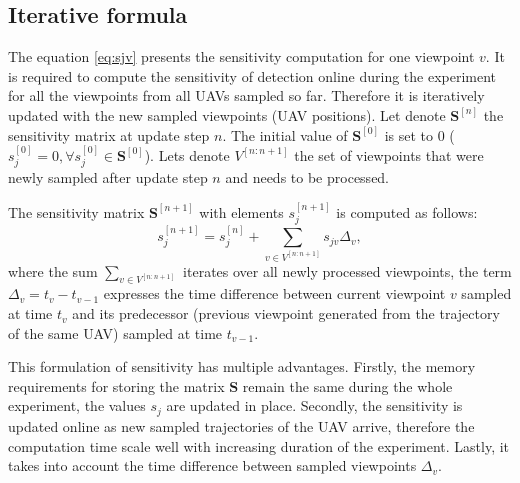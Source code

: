 \subsection{Iterative formula}
The equation \ref{eq:sjv} presents the sensitivity computation for one viewpoint $v$. 
It is required to compute the sensitivity of detection online during the experiment for all the viewpoints from all \ac{UAV}s sampled so far. 
Therefore it is iteratively updated with the new sampled viewpoints (\ac{UAV} positions).
Let denote $\mathbf{S}^{[n]}$ the sensitivity matrix at update step $n$.
The initial value of $\mathbf{S}^{[0]}$ is set to $0$ ($s_{j}^{[0]} = 0 ,\forall s_{j}^{[0]} \in \mathbf{S}^{[0]}$).
Lets denote $V^{[n:n+1]}$ the set of viewpoints that were newly sampled after update step $n$ and needs to be processed. 

The sensitivity matrix $\mathbf{S}^{[n+1]}$ with elements $s_{j}^{[n+1]}$ is computed as follows:
\begin{equation}
  s_{j}^{[n+1]} = s_{j}^{[n]} + \sum_{v \in V^{[n:n+1]}} s_{jv} \Delta_{v}, 
  \label{eq:sen_iter}
\end{equation}
where the sum $\sum_{v \in V^{[n:n+1]}}$ iterates over all newly processed viewpoints, 
the term $\Delta_{v} = t_{v} - t_{v-1}$ expresses the time difference between current viewpoint $v$ sampled at time $t_{v}$ and its predecessor (previous viewpoint generated from the trajectory of the same \ac{UAV}) sampled at time $t_{v-1}$. 

This formulation of sensitivity has multiple advantages.
Firstly, the memory requirements for storing the matrix $\mathbf{S}$ remain the same during the whole experiment, the values $s_{j}$ are updated in place.
Secondly, the sensitivity is updated online as new sampled trajectories of the \ac{UAV} arrive, therefore the computation time scale well with increasing duration of the experiment.
Lastly, it takes into account the time difference between sampled viewpoints $\Delta_{v}$.%


